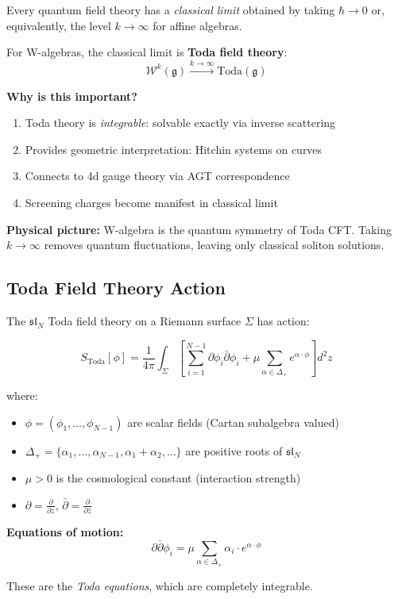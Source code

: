 \begin{motivation}
\label{mot:semiclassical-toda}
Every quantum field theory has a \emph{classical limit} obtained by taking $\hbar \to 0$ 
or, equivalently, the level $k \to \infty$ for affine algebras.

For W-algebras, the classical limit is \textbf{Toda field theory}:
$$\mathcal{W}^k(\mathfrak{g}) \xrightarrow{k \to \infty} \text{Toda}(\mathfrak{g})$$

\textbf{Why is this important?}
\begin{enumerate}
\item Toda theory is \emph{integrable}: solvable exactly via inverse scattering
\item Provides geometric interpretation: Hitchin systems on curves
\item Connects to 4d gauge theory via AGT correspondence
\item Screening charges become manifest in classical limit
\end{enumerate}

\textbf{Physical picture:} W-algebra is the quantum symmetry of Toda CFT. Taking 
$k \to \infty$ removes quantum fluctuations, leaving only classical soliton solutions.
\end{motivation}

\subsection{Toda Field Theory Action}

\begin{definition}
\label{def:toda-action}
The $\mathfrak{sl}_N$ Toda field theory on a Riemann surface $\Sigma$ has action:

$$S_{\text{Toda}}[\phi] = \frac{1}{4\pi} \int_\Sigma \left[\sum_{i=1}^{N-1} 
\partial\phi_i \bar{\partial}\phi_i + \mu \sum_{\alpha \in \Delta_+} 
e^{\alpha \cdot \phi}\right] d^2z$$

where:
\begin{itemize}
\item $\phi = (\phi_1, \ldots, \phi_{N-1})$ are scalar fields (Cartan subalgebra valued)
\item $\Delta_+ = \{\alpha_1, \ldots, \alpha_{N-1}, \alpha_1+\alpha_2, \ldots\}$ 
are positive roots of $\mathfrak{sl}_N$
\item $\mu > 0$ is the cosmological constant (interaction strength)
\item $\partial = \frac{\partial}{\partial z}$, $\bar{\partial} = 
\frac{\partial}{\partial \bar{z}}$
\end{itemize}

\textbf{Equations of motion:}
$$\partial\bar{\partial}\phi_i = \mu \sum_{\alpha \in \Delta_+} \alpha_i \cdot 
e^{\alpha \cdot \phi}$$

These are the \emph{Toda equations}, which are completely integrable.
\end{definition}

